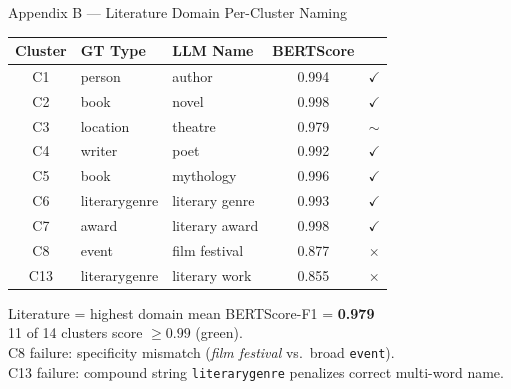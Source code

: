 \documentclass[aspectratio=169,10pt]{beamer}
\newcommand{\hl}[1]{\textcolor{gold!80!black}{\textbf{#1}}}
\newcommand{\cmark}{\textcolor{dkgreen}{$\checkmark$}}
\newcommand{\xmark}{\textcolor{dkred}{$\times$}}
\begin{document}
\begin{frame}{Appendix B — Literature Domain Per-Cluster Naming}
  \small
  \begin{tabular}{c|l|l|c|c}
    \toprule
    \textbf{Cluster} & \textbf{GT Type} & \textbf{LLM Name} & \textbf{BERTScore} & \\
    \midrule
    C1  & person       & author           & 0.994 & \cmark \\
    C2  & book         & novel            & 0.998 & \cmark \\
    C3  & location     & theatre          & 0.979 & \hl{$\sim$} \\
    C4  & writer       & poet             & 0.992 & \cmark \\
    C5  & book         & mythology        & 0.996 & \cmark \\
    C6  & literarygenre & literary genre  & 0.993 & \cmark \\
    C7  & award        & literary award   & 0.998 & \cmark \\
    C8  & event        & film festival    & 0.877 & \xmark \\
    C13 & literarygenre & literary work   & 0.855 & \xmark \\
    \bottomrule
  \end{tabular}
  \vspace{0.3em}

  Literature = highest domain mean BERTScore-F1 = \textbf{0.979}\\
  11 of 14 clusters score $\geq 0.99$ (green).\\
  C8 failure: specificity mismatch (\textit{film festival} vs.\ broad \texttt{event}).\\
  C13 failure: compound string \texttt{literarygenre} penalizes correct multi-word name.
\end{frame}
\end{document}
